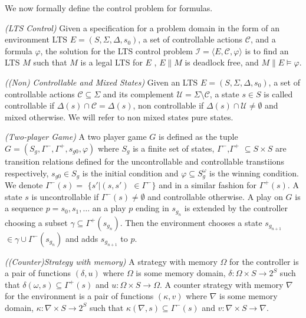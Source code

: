 %

We now formally define the control problem for \gr formulas.


\begin{definition}\label{def:lts-control}\emph{(LTS \gr Control)}
Given a specification for a problem domain in the form of an environment LTS $E =  (S, \Sigma, \Delta, s_0)$, a set of controllable actions $\mathcal{C}$, and a \gr formula  $\varphi$, the solution for the LTS control problem $\mathcal{I}=\langle E, \mathcal{C}, \varphi\rangle$ is to find an LTS $M$ such that $M$ is a legal LTS for $E$ ,
$E\|M$ is deadlock free, and $M\|E \models \varphi$.
\end{definition}

\begin{definition}\label{def:state-characterization}\emph{((Non) Controllable and Mixed States)}
Given an LTS $E =  (S, \Sigma, \Delta, s_0)$, a set of controllable actions $\mathcal{C} \subseteq \Sigma$ and its complement $\mathcal{U} = \Sigma \setminus \mathcal{C}$,  a state $s \in S$ is called controllable if $\Delta(s) \cap \mathcal{C} = \Delta(s)$, non controllable if $\Delta(s) \cap \mathcal{U} \neq \emptyset$ and mixed otherwise.  We will refer to non mixed states pure states.
\end{definition}

\begin{definition}\label{def:twoplayer-game}\emph{(Two-player Game)}
A two player game $G$ is defined as the tuple $G=(S_g,\Gamma^{-},\Gamma^{+},s_{g0}, \varphi)$ where $S_{g}$ is a finite set of states, $\Gamma^{-}$,$\Gamma^{+}$ $\subseteq S\times S$ are transition relations defined for the uncontrollable and controllable transtiions respectively, $s_{g0}\in S_{g}$ is the initial condition and $\varphi \subseteq S_{g}^{\omega}$ is the winning condition.  We denote $\Gamma^{-}(s) =$ $\{s'|(s,s')$ $\in \Gamma^{-}\}$ and in a similar fashion for $\Gamma^{+}(s)$. A state $s$ is uncontrollable if $\Gamma^{-}(s)\neq \emptyset$ and controllable otherwise.  A play on $G$ is a sequence $p=s_0,s_1,\ldots$ an a play $p$ ending in $s_{g_{n}}$ is extended by the controller choosing a subset $\gamma \subseteq \Gamma^{+}(s_{g_{n}})$.  Then the environment chooses a state $s_{g_{n+1}}$ $\in \gamma \cup \Gamma^{-}(s_{g_{n}})$ and adds $s_{g_{n+1}}$ to $p$.
\end{definition}

\begin{definition}\label{def:strategy}\emph{((Counter)Strategy with memory)}
A strategy with memory $\Omega$ for the controller is a pair of functions $(\delta, u)$ where $\Omega$ is some memory domain, $\delta:\Omega\times S \rightarrow 2^{S}$ such that $\delta(\omega, s) \subseteq \Gamma^{+}(s)$ and $u:\Omega \times S \rightarrow \Omega$.
A counter strategy with memory $\nabla$ for the environment is a pair of functions $(\kappa, v)$ where $\nabla$ is some memory domain, $\kappa:\nabla\times S \rightarrow 2^{S}$ such that $\kappa(\nabla, s) \subseteq \Gamma^{-}(s)$ and $v:\nabla \times S \rightarrow \nabla$.
\end{definition}


